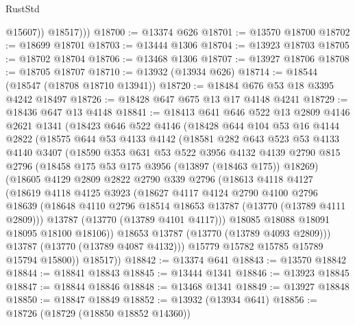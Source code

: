 \begin{lexlean}{RustStd}
\begin{coremodule}
              @15607))
          @18517)))
@18700 := @13374 @626
@18701 := @13570 @18700
@18702 := @18699 @18701
@18703 := @13444 @1306
@18704 := @13923 @18703
@18705 := @18702 @18704
@18706 := @13468 @1306
@18707 := @13927 @18706
@18708 := @18705 @18707
@18710 := @13932 (@13934 @626)
@18714 := @18544 (@18547 (@18708 @18710 @13941))
@18720 := @18484 @676 @53 @18 @3395 @4242 @18497
@18726 := @18428 @647 @675 @13 @17 @4148 @4241
@18729 := @18436 @647 @13 @4148
@18841 := @18413
    @641
    @646
    @522
    @13
    @2809
    @4146
    @2621
    @1341
    (@18423
      @646
      @522
      @4146
      (@18428
        @644
        @104
        @53
        @16
        @4144
        @2822
        (@18575
          @644
          @53
          @4133
          @4142
          (@18581
            @282
            @643
            @523
            @53
            @4133
            @4140
            @3407
            (@18590
              @353
              @631
              @53
              @522
              @3956
              @4132
              @4139
              @2790
              @815
              @2796
              (@18458 @175 @53 @175 @3956 (@13897 (@18463 @175)) @18269)
              (@18605
                @4129
                @2809
                @2822
                @2790
                @339
                @2796
                (@18613
                  @4118
                  @4127
                  (@18619
                    @4118
                    @4125
                    @3923
                    (@18627
                      @4117
                      @4124
                      @2790
                      @4100
                      @2796
                      @18639
                      (@18648 @4110 @2796 @18514 @18653 @13787 (@13770 (@13789 @4111 @2809)))
                      @13787
                      (@13770 (@13789 @4101 @4117)))
                    @18085
                    @18088
                    @18091
                    @18095
                    @18100
                    @18106))
                @18653
                @13787
                (@13770 (@13789 @4093 @2809)))
              @13787
              (@13770 (@13789 @4087 @4132)))
            @15779
            @15782
            @15785
            @15789
            @15794
            @15800))
        @18517))
@18842 := @13374 @641
@18843 := @13570 @18842
@18844 := @18841 @18843
@18845 := @13444 @1341
@18846 := @13923 @18845
@18847 := @18844 @18846
@18848 := @13468 @1341
@18849 := @13927 @18848
@18850 := @18847 @18849
@18852 := @13932 (@13934 @641)
@18856 := @18726 (@18729 (@18850 @18852 @14360))

\end{coremodule}
\end{lexlean}
